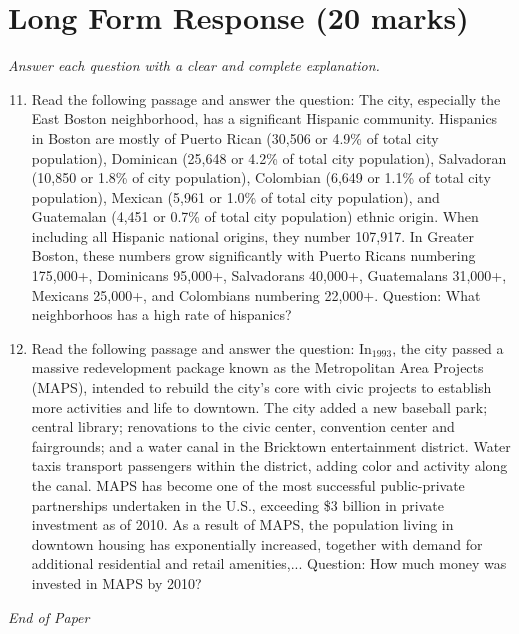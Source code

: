 \documentclass[12pt]{article}
\begin{document}
\section*{Long Form Response (20 marks)}
\textit{Answer each question with a clear and complete explanation.}
\begin{enumerate}[label=\arabic*.]
\setcounter{enumi}{10}
\item Read the following passage and answer the question: The city, especially the East Boston neighborhood, has a significant Hispanic community. Hispanics in Boston are mostly of Puerto Rican (30,506 or 4.9\% of total city population), Dominican (25,648 or 4.2\% of total city population), Salvadoran (10,850 or 1.8\% of city population), Colombian (6,649 or 1.1\% of total city population), Mexican (5,961 or 1.0\% of total city population), and Guatemalan (4,451 or 0.7\% of total city population) ethnic origin. When including all Hispanic national origins, they number 107,917. In Greater Boston, these numbers grow significantly with Puerto Ricans numbering 175,000+, Dominicans 95,000+, Salvadorans 40,000+, Guatemalans 31,000+, Mexicans 25,000+, and Colombians numbering 22,000+. Question: What neighborhoos has a high rate of hispanics?
\item Read the following passage and answer the question: In$_{1993}$, the city passed a massive redevelopment package known as the Metropolitan Area Projects (MAPS), intended to rebuild the city's core with civic projects to establish more activities and life to downtown. The city added a new baseball park; central library; renovations to the civic center, convention center and fairgrounds; and a water canal in the Bricktown entertainment district. Water taxis transport passengers within the district, adding color and activity along the canal. MAPS has become one of the most successful public-private partnerships undertaken in the U.S., exceeding \$3 billion in private investment as of 2010. As a result of MAPS, the population living in downtown housing has exponentially increased, together with demand for additional residential and retail amenities,... Question: How much money was invested in MAPS by 2010?
\end{enumerate}

\vfill
\noindent\textit{End of Paper}
\end{document}
